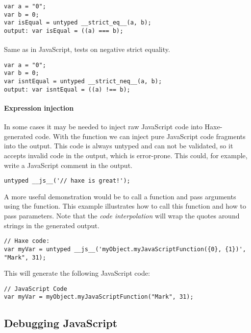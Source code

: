 \begin{lstlisting}
var a = "0";
var b = 0;
var isEqual = untyped __strict_eq__(a, b);
output: var isEqual = ((a) === b);
\end{lstlisting}

\paragraph{} 
Same as   in JavaScript, tests on negative strict equality.

\begin{lstlisting}
var a = "0";
var b = 0;
var isntEqual = untyped __strict_neq__(a, b);
output: var isntEqual = ((a) !== b);
\end{lstlisting}

\paragraph{Expression injection} 

In some cases it may be needed to inject raw JavaScript code into Haxe-generated code. With the  function we can inject pure JavaScript code fragments into the output. This code is always untyped and can not be validated, so it accepts invalid code in the output, which is error-prone.
This could, for example, write a JavaScript comment in the output.

\begin{lstlisting}
untyped __js__('// haxe is great!');
\end{lstlisting}

A more useful demonstration would be to call a function and pass  arguments using the  function. This example illustrates how to call this function and how to pass parameters. Note that the \emph{code interpolation} will wrap the quotes around strings in the generated output.

\begin{lstlisting}
// Haxe code:
var myVar = untyped __js__('myObject.myJavaScriptFunction({0}, {1})', "Mark", 31);
\end{lstlisting}

This will generate the following JavaScript code:
\begin{lstlisting}
// JavaScript Code
var myVar = myObject.myJavaScriptFunction("Mark", 31);
\end{lstlisting}

\subsection{Debugging JavaScript}
\label{target-javascript-debugging}

